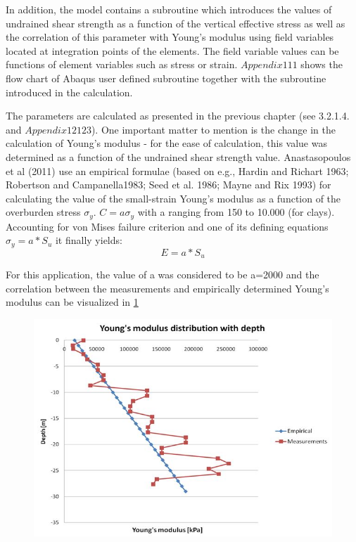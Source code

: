 \documentclass[10pt,a4paper]{report}
\begin{document}
In addition, the model contains a subroutine which introduces the values of undrained shear strength as a function of the vertical effective stress as well as the correlation of this parameter with Young's modulus using field variables located at integration points of the elements. The field variable values can be functions of element variables such as stress or strain. $Appendix 111$ shows the flow chart of Abaqus user defined subroutine together with the subroutine introduced in the calculation.

The parameters are calculated as presented in the previous chapter (see 3.2.1.4. and $Appendix 12123$). One important matter to mention is the change in the calculation of Young's modulus - for the ease of calculation, this value was determined as a function of the undrained shear strength value. Anastasopoulos et al (2011) use an empirical formulae (based on e.g., Hardin and Richart 1963; Robertson and Campanella1983; Seed et al. 1986; Mayne and Rix 1993) for calculating the value of the small-strain Young's modulus as a function of the overburden stress $\sigma_y$. $C=a{\sigma }_{y}$ with a ranging from 150 to 10.000 (for clays). Accounting for von Mises failure criterion and one of its defining equations ${\sigma}_{y}=a*S_u$ it finally yields:
\begin{equation}
	E=a*S_u
\end{equation}

For this application, the value of a was considered to be a=2000 and the correlation between the measurements and empirically determined Young's modulus can be visualized in \ref{Young}

\begin{figure}[h!]
\centering
\includegraphics[width=0.7\linewidth]{"Young's modulus"}
\caption[Young's modulus distribution along depth]{}
\caption{}
\label{Young}
\end{figure}
\end{document}

